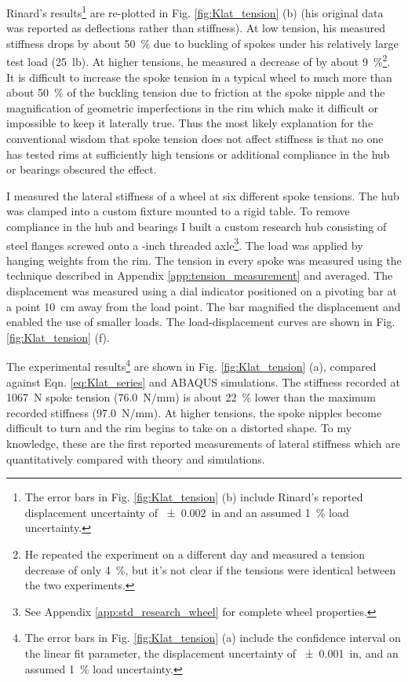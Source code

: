 \documentclass[\rootdir/thesis.tex]{subfiles}
\begin{document}
Rinard's results\footnote{The error bars in Fig. \ref{fig:Klat_tension} (b) include Rinard's reported displacement uncertainty of \SI{+-0.002}{in} and an assumed \SI{1}{\percent} load uncertainty.} are re-plotted in Fig. \ref{fig:Klat_tension} (b) (his original data was reported as deflections rather than stiffness). At low tension, his measured stiffness drops by about \SI{50}{\percent} due to buckling of spokes under his relatively large test load (\SI{25}{lb}). At higher tensions, he measured a decrease of by about \SI{9}{\percent}\footnote{He repeated the experiment on a different day and measured a tension decrease of only \SI{4}{\percent}, but it's not clear if the tensions were identical between the two experiments.}. It is difficult to increase the spoke tension in a typical wheel to much more than about \SI{50}{\percent} of the buckling tension due to friction at the spoke nipple and the magnification of geometric imperfections in the rim which make it difficult or impossible to keep it laterally true. Thus the most likely explanation for the conventional wisdom that spoke tension does not affect stiffness is that no one has tested rims at sufficiently high tensions or additional compliance in the hub or bearings obscured the effect.

I measured the lateral stiffness of a wheel at six different spoke tensions. The hub was clamped into a custom fixture mounted to a rigid table. To remove compliance in the hub and bearings I built a custom research hub consisting of steel flanges screwed onto a -inch threaded axle\footnote{See Appendix \ref{app:std_research_wheel} for complete wheel properties.}. The load was applied by hanging weights from the rim. The tension in every spoke was measured using the technique described in Appendix \ref{app:tension_measurement} and averaged. The displacement was measured using a dial indicator positioned on a pivoting bar at a point \SI{10}{cm} away from the load point. The bar magnified the displacement and enabled the use of smaller loads. The load-displacement curves are shown in Fig. \ref{fig:Klat_tension} (f).

The experimental results\footnote{The error bars in Fig. \ref{fig:Klat_tension} (a) include the confidence interval on the linear fit parameter, the displacement uncertainty of \SI{+-0.001}{in}, and an assumed \SI{1}{\percent} load uncertainty.} are shown in Fig. \ref{fig:Klat_tension} (a), compared against Eqn. \eqref{eq:Klat_series} and ABAQUS simulations. The stiffness recorded at \SI{1067}{N} spoke tension (\SI{76.0}{N/mm}) is about \SI{22}{\percent} lower than the maximum recorded stiffness (\SI{97.0}{N/mm}). At higher tensions, the spoke nipples become difficult to turn and the rim begins to take on a distorted shape. To my knowledge, these are the first reported measurements of lateral stiffness which are quantitatively compared with theory and simulations.
\end{document}

